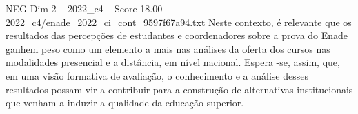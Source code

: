 \begin{textsample}{NEG Dim 2 – 2022\_c4 – Score 18.00 – 2022\_c4/enade\_2022\_ci\_cont\_9597f67a94.txt}
Neste contexto, é relevante que os resultados das percepções de estudantes e coordenadores sobre a prova do Enade ganhem peso como um elemento a mais nas análises da oferta dos cursos nas modalidades presencial e a distância, em nível nacional.
Espera -se, assim, que, em uma visão formativa de avaliação, o conhecimento e a análise desses resultados possam vir a contribuir para a construção de alternativas institucionais que venham a induzir a qualidade da educação superior.

\end{textsample}
